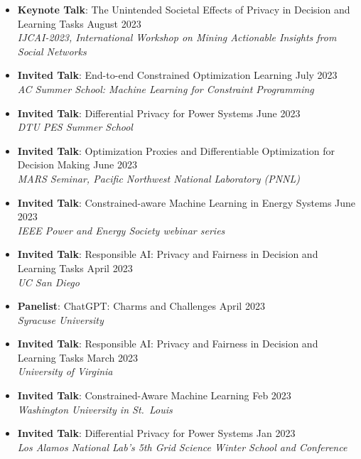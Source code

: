 \begin{itemize}
  \item {\bf Keynote Talk}: {The Unintended Societal Effects of Privacy in Decision and Learning Tasks} \hfill{August 2023}\\
  {\em  IJCAI-2023, International Workshop on Mining Actionable Insights from Social Networks}

  \item {\bf Invited Talk}: {End-to-end Constrained Optimization Learning} \hfill{July 2023}\\
  {\em  AC Summer School: Machine Learning for Constraint Programming}

  \item {\bf Invited Talk}: {Differential Privacy for Power Systems} \hfill{June 2023}\\
  {\em  DTU PES Summer School}

  \item {\bf Invited Talk}: {Optimization Proxies and Differentiable Optimization for Decision Making} \hfill{June 2023}\\
  {\em  MARS Seminar, Pacific Northwest National Laboratory (PNNL)}

  \item {\bf Invited Talk}: {Constrained-aware Machine Learning in Energy Systems} \hfill{June 2023}\\
  {\em  IEEE Power and Energy Society webinar series}

  \item {\bf Invited Talk}: {Responsible AI: Privacy and Fairness in Decision and Learning Tasks} \hfill{April 2023}\\
  {\em  UC San Diego}

  \item {\bf Panelist}: {ChatGPT: Charms and Challenges} \hfill{April 2023}\\
  {\em  Syracuse University}

  \item {\bf Invited Talk}: {Responsible AI: Privacy and Fairness in Decision and Learning Tasks} \hfill{March 2023}\\
  {\em  University of Virginia}

  \item {\bf Invited Talk}: {Constrained-Aware Machine Learning} \hfill{Feb 2023}\\
  {\em  Washington University in St.~Louis}

  \item {\bf Invited Talk}: {Differential Privacy for Power Systems} \hfill{Jan 2023}\\
  {\em  Los Alamos National Lab's 5th Grid Science Winter School and Conference}


\end{itemize}
